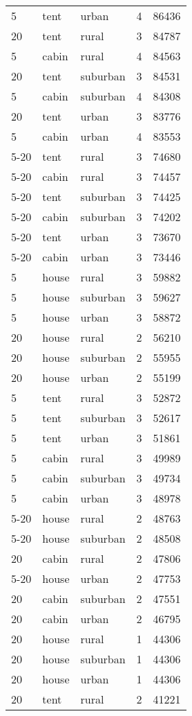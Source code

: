 \begin{center}
\begin{longtable}{llllr}
5 & tent & urban & 4 & 86436 \\
20 & tent & rural & 3 & 84787 \\
5 & cabin & rural & 4 & 84563 \\
20 & tent & suburban & 3 & 84531 \\
5 & cabin & suburban & 4 & 84308 \\
20 & tent & urban & 3 & 83776 \\
5 & cabin & urban & 4 & 83553 \\
5-20 & tent & rural & 3 & 74680 \\
5-20 & cabin & rural & 3 & 74457 \\
5-20 & tent & suburban & 3 & 74425 \\
5-20 & cabin & suburban & 3 & 74202 \\
5-20 & tent & urban & 3 & 73670 \\
5-20 & cabin & urban & 3 & 73446 \\
5 & house & rural & 3 & 59882 \\
5 & house & suburban & 3 & 59627 \\
5 & house & urban & 3 & 58872 \\
20 & house & rural & 2 & 56210 \\
20 & house & suburban & 2 & 55955 \\
20 & house & urban & 2 & 55199 \\
5 & tent & rural & 3 & 52872 \\
5 & tent & suburban & 3 & 52617 \\
5 & tent & urban & 3 & 51861 \\
5 & cabin & rural & 3 & 49989 \\
5 & cabin & suburban & 3 & 49734 \\
5 & cabin & urban & 3 & 48978 \\
5-20 & house & rural & 2 & 48763 \\
5-20 & house & suburban & 2 & 48508 \\
20 & cabin & rural & 2 & 47806 \\
5-20 & house & urban & 2 & 47753 \\
20 & cabin & suburban & 2 & 47551 \\
20 & cabin & urban & 2 & 46795 \\
20 & house & rural & 1 & 44306 \\
20 & house & suburban & 1 & 44306 \\
20 & house & urban & 1 & 44306 \\
20 & tent & rural & 2 & 41221 \\

\end{longtable}
\end{center}
